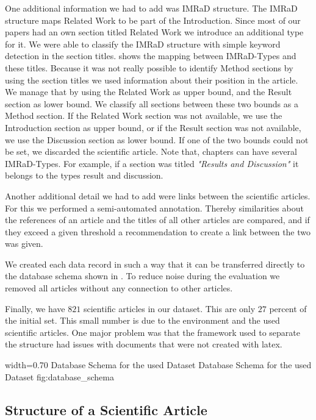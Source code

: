 One additional information we had to add was IMRaD structure. The IMRaD structure maps Related Work to be part of the Introduction. Since most of our papers had an own section titled Related Work we introduce an additional type for it. We were able to classify the IMRaD structure with simple keyword detection in the section titles.  shows the mapping between IMRaD-Types and these titles. Because it was not really possible to identify Method sections by using the section titles we used information about their position in the article. We manage that by using the Related Work as upper bound, and the Result section as lower bound. We classify all sections between these two bounds as a Method section. If the Related Work section was not available, we use the Introduction section as upper bound, or if the Result section was not available, we use the Discussion section as lower bound. If one of the two bounds could not be set, we discarded the scientific article. Note that, chapters can have several IMRaD-Types. For example, if a section was titled \textit{"Results and Discussion"} it belongs to the types result and discussion.

Another additional detail we had to add were links between the scientific articles. For this we performed a semi-automated annotation. Thereby similarities about the references of an article and the titles of all other articles are compared, and if they exceed a given threshold a recommendation to create a link between the two was given.

We created each data record in such a way that it can be transferred directly to the database schema shown in . To reduce noise during the evaluation we removed all articles without any connection to other articles.

Finally, we have $821$ scientific articles in our dataset. This are only $27$ percent of the initial set. This small number is due to the environment and the used scientific articles. One major problem was that the framework used to separate the structure had issues with documents that were not created with latex.

      {width=0.70\textwidth}
      {Database Schema for the used Dataset}
      {Database Schema for the used Dataset}
      {fig:database_schema}

\subsection{Structure of a Scientific Article}
\label{sec:structure_scientific_article}

